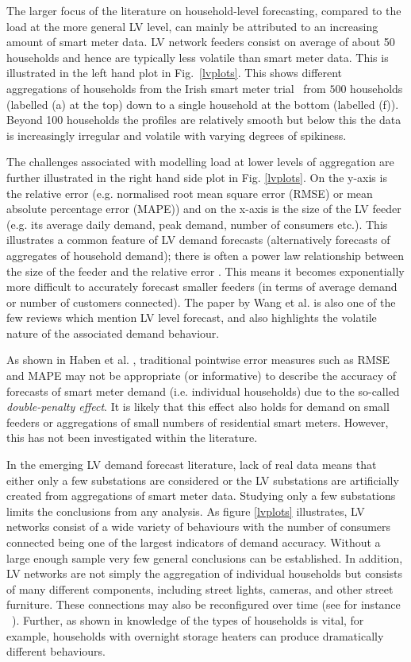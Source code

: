 The larger focus of the literature on household-level forecasting, compared to the load at the more general LV level, can mainly be attributed to an increasing amount of smart meter data. LV network feeders consist on average of about 50 households \cite{Haben2019stl} and hence are typically less volatile than smart meter data. This is illustrated in the left hand plot in Fig.~\ref{lvplots}. This shows different aggregations of households from the Irish smart meter trial~\cite{Commission2012csm} from $500$ households (labelled (a) at the top) down to a single household at the bottom (labelled (f)). Beyond 100 households the profiles are relatively smooth but below this the data is increasingly irregular and volatile with varying degrees of spikiness.   

The challenges associated with modelling load at lower levels of aggregation are further illustrated in the right hand side plot in Fig. \ref{lvplots}. On the y-axis is the relative error (e.g. normalised root mean square error (RMSE) or mean absolute percentage error (MAPE)) and on the x-axis is the size of the LV feeder (e.g. its average daily demand, peak demand, number of consumers etc.). This illustrates a common feature of LV demand forecasts (alternatively forecasts of aggregates of household demand); there is often a power law relationship between the size of the feeder and the relative error \cite{mirowski2014dfi}. This means it becomes exponentially more difficult to accurately forecast smaller feeders (in terms of average demand or number of customers connected). The paper by Wang et al. \cite{Wang2018ros} is also one of the few reviews which mention LV level forecast, and also highlights the volatile nature of the associated demand behaviour. 

As shown in Haben et al. \cite{Haben2014ane}, traditional pointwise error measures such as RMSE and MAPE may not be appropriate (or informative) to describe the accuracy of forecasts of smart meter demand (i.e. individual households) due to the so-called \textit{double-penalty effect}. It is likely that this effect also holds for demand on small feeders or aggregations of small numbers of residential smart meters. However, this has not been investigated within the literature.  

In the emerging LV demand forecast literature, lack of real data means that either only a few substations are considered or the LV substations are artificially created from aggregations of smart meter data. Studying only a few substations limits the conclusions from any analysis. As figure \ref{lvplots} illustrates, LV networks consist of a wide variety of behaviours with the number of consumers connected being one of the largest indicators of demand accuracy. Without a large enough sample very few general conclusions can be established. In addition, LV networks are not simply the aggregation of individual households but consists of many different components, including street lights, cameras, and other street furniture. These connections may also be reconfigured over time (see for instance ~\cite{mirowski2014dfi}). Further, as shown in \cite{Haben2019stl} knowledge of the types of households is vital, for example, households with overnight storage heaters can produce dramatically different behaviours. 

